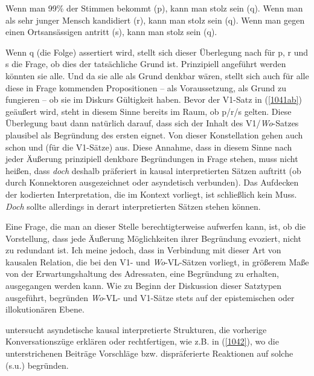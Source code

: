 {\begin{exe}
	\ex\label{1041} 
		\begin{xlist}	
			\ex\label{1041a} Wenn man 99\% der Stimmen bekommt (p), kann man stolz sein (q).
			\ex\label{1041b} Wenn man als sehr junger Mensch kandidiert (r), kann man stolz sein (q).
			\ex\label{1041c} Wenn man gegen einen Ortsansässigen antritt (s), kann man stolz sein (q).
		\end{xlist}
\end{exe}
Wenn q (die Folge) assertiert wird, stellt sich dieser Überlegung nach für p, r und s die Frage, ob dies der tatsächliche Grund ist. Prinzipiell angeführt werden könnten sie alle. Und da sie alle als Grund denkbar wären, stellt sich auch für alle diese in Frage kommenden Propositionen – als Voraussetzung, als Grund zu fungieren – ob sie im Diskurs Gültigkeit haben. Bevor der V1-Satz in (\ref{1041ab}) geäußert wird, steht in diesem Sinne bereits im Raum, ob p/r/s gelten. Diese Überlegung baut dann natürlich darauf, dass sich der Inhalt des V1/\textit{Wo}-Satzes plausibel als Begründung des ersten eignet. Von dieser Konstellation gehen auch schon \citet{Oennerfors1997} und \citet{Pittner2011} (für die V1-Sätze) aus. Diese Annahme, dass in diesem Sinne nach jeder Äußerung prinzipiell denkbare Begründungen in Frage stehen, muss nicht heißen, dass \textit{doch} deshalb präferiert in kausal interpretierten Sätzen auftritt (ob durch Konnektoren ausgezeichnet oder asyndetisch  verbunden). Das Aufdecken der kodierten Interpretation, die im Kontext vorliegt, ist schließlich kein Muss. \textit{Doch} sollte allerdings in derart interpretierten Sätzen stehen können. 

Eine Frage, die man an dieser Stelle berechtigterweise aufwerfen kann, ist, ob die Vorstellung, dass jede Äußerung Möglichkeiten ihrer Begründung evoziert, nicht zu redundant ist. Ich meine jedoch, dass in Verbindung mit dieser Art von kausalen Relation, die bei den V1- und \textit{Wo}-VL-Sätzen vorliegt, in größerem Maße von der Erwartungshaltung des Adressaten, eine Begründung zu erhalten, ausgegangen werden kann. Wie zu Beginn der Diskussion dieser Satztypen ausgeführt, begründen \textit{Wo}-VL- und V1-Sätze stets auf  der epistemischen oder  illokutionären Ebene. 

\citet{Gohl2000} untersucht asyndetische kausal interpretierte Strukturen, die vor\-herige Konversationszüge erklären oder rechtfertigen, wie z.B. in (\ref{1042}), wo die unterstrichenen Beiträge Vorschläge bzw. dispräferierte Reaktionen auf solche (s.u.) begründen.
		
}
